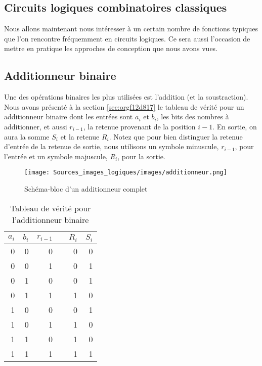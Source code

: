 \documentclass[11pt]{article}
\begin{document}
\subsection{Circuits logiques combinatoires classiques}
\label{sec:orga13f6e2}

Nous allons maintenant nous intéresser à un certain nombre de
fonctions typiques que l'on rencontre fréquemment en circuits
logiques. Ce sera aussi l'occasion de mettre en pratique les approches
de conception que nous avons vues.


\subsection{Additionneur binaire}
\label{sec:orgef00aaf}

Une des opérations binaires les plus utilisées est l'addition (et la
soustraction). Nous avons présenté à la section \ref{sec:orgf12d817} le tableau de vérité pour un additionneur binaire dont les
entrées sont \(a_{i}\) et \(b_{i}\), les bits des nombres à
additionner, et aussi \(r_{i-1}\), la retenue provenant de la position
\(i-1\). En sortie, on aura la somme \(S_{i}\) et la retenue
\(R_{i}\). Notez que pour bien distinguer la retenue d'entrée de la
retenue de sortie, nous utilisons un symbole minuscule, \(r_{i-1}\),
pour l'entrée et un symbole majuscule, \(R_{i}\), pour la sortie. 

\begin{figure}[htbp]
\centering
\texttt{[image: Sources\_images\_logiques/images/additionneur.png]}
\caption{\label{fig:org7c2f94b}Schéma-bloc d'un additionneur complet}
\end{figure}

\begin{table}[htbp]
\caption{\label{tab:orga268d81}Tableau de vérité pour l'additionneur binaire}
\centering
\begin{tabular}{rrrlrr}
\(a_{i}\) & \(b_{i}\) & \(r_{i-1}\) &  & \(R_{i}\) & \(S_{i}\)\\[0pt]
\hline
0 & 0 & 0 &  & 0 & 0\\[0pt]
0 & 0 & 1 &  & 0 & 1\\[0pt]
0 & 1 & 0 &  & 0 & 1\\[0pt]
0 & 1 & 1 &  & 1 & 0\\[0pt]
1 & 0 & 0 &  & 0 & 1\\[0pt]
1 & 0 & 1 &  & 1 & 0\\[0pt]
1 & 1 & 0 &  & 1 & 0\\[0pt]
1 & 1 & 1 &  & 1 & 1\\[0pt]
\end{tabular}
\end{table}
\end{document}
